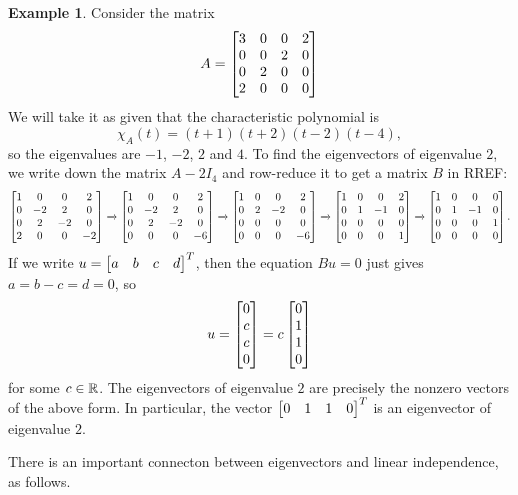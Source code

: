 \documentclass[reqno]{amsart}
\theoremstyle{definition}
\newtheorem{example}[theorem]{Example}
\begin{document}
\begin{example}\label{eg-eigen-v}
 Consider the matrix
 \[ A = \left[\begin{matrix}
         3 & 0 & 0 & 2 \\
         0 & 0 & 2 & 0 \\
         0 & 2 & 0 & 0 \\
         2 & 0 & 0 & 0
        \end{matrix}\right]
 \]
 We will take it as given that the characteristic polynomial is
 \[ \chi_A(t) = (t+1)(t+2)(t-2)(t-4), \]
 so the eigenvalues are $-1$, $-2$, $2$ and $4$.  To find the
 eigenvectors of eigenvalue $2$, we write down the matrix $A-2I_4$ and
 row-reduce it to get a matrix $B$ in RREF:
 \[\left[\begin{matrix}
    1 &  0 &  0 &  2 \\
    0 & -2 &  2 &  0 \\
    0 &  2 & -2 &  0 \\
    2 &  0 &  0 & -2
   \end{matrix}\right]
   \xrightarrow{}
   \left[\begin{matrix}
    1 &  0 &  0 &  2 \\
    0 & -2 &  2 &  0 \\
    0 &  2 & -2 &  0 \\
    0 &  0 &  0 & -6
   \end{matrix}\right]
   \xrightarrow{}
   \left[\begin{matrix}
    1 &  0 &  0 &  2 \\
    0 &  2 & -2 &  0 \\
    0 &  0 &  0 &  0 \\
    0 &  0 &  0 & -6
   \end{matrix}\right]
   \xrightarrow{}
   \left[\begin{matrix}
    1 &  0 &  0 &  2 \\
    0 &  1 & -1 &  0 \\
    0 &  0 &  0 &  0 \\
    0 &  0 &  0 &  1
   \end{matrix}\right]
   \xrightarrow{}
   \left[\begin{matrix}
    1 &  0 &  0 &  0 \\
    0 &  1 & -1 &  0 \\
    0 &  0 &  0 &  1 \\
    0 &  0 &  0 &  0
   \end{matrix}\right].
 \]
 If we write $u=\left[\begin{matrix} a & b & c & d\end{matrix}\right]^T$, then the equation $Bu=0$
 just gives $a=b-c=d=0$, so
 \[ u = \left[\begin{matrix} 0 \\ c \\ c \\ 0 \end{matrix}\right] = c \left[\begin{matrix} 0 \\ 1 \\ 1 \\ 0 \end{matrix}\right] \]
 for some $c\in{\mathbb{R}}$.  The eigenvectors of eigenvalue $2$ are
 precisely the nonzero vectors of the above form.  In particular, the
 vector $\left[\begin{matrix} 0 & 1 & 1 & 0\end{matrix}\right]^T$ is an eigenvector of eigenvalue $2$.
\end{example}

There is an important connecton between eigenvectors and linear
independence, as follows.
\end{document}
